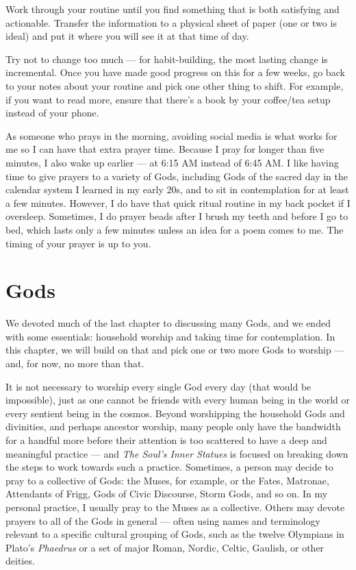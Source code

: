 \documentclass[
]{book}
\begin{document}
Work through your routine until you find something that is both satisfying and actionable. Transfer the information to a physical sheet of paper (one or two is ideal) and put it where you will see it at that time of day.

Try not to change too much --- for habit-building, the most lasting change is incremental. Once you have made good progress on this for a few weeks, go back to your notes about your routine and pick one other thing to shift. For example, if you want to read more, ensure that there's a book by your coffee/tea setup instead of your phone.

As someone who prays in the morning, avoiding social media is what works for me so I can have that extra prayer time. Because I pray for longer than five minutes, I also wake up earlier --- at 6:15 AM instead of 6:45 AM. I like having time to give prayers to a variety of Gods, including Gods of the sacred day in the calendar system I learned in my early 20s, and to sit in contemplation for at least a few minutes. However, I do have that quick ritual routine in my back pocket if I oversleep. Sometimes, I do prayer beads after I brush my teeth and before I go to bed, which lasts only a few minutes unless an idea for a poem comes to me. The timing of your prayer is up to you.

\hypertarget{gods}{%
\chapter{Gods}\label{gods}}

We devoted much of the last chapter to discussing many Gods, and we ended with some essentials: household worship and taking time for contemplation. In this chapter, we will build on that and pick one or two more Gods to worship --- and, for now, no more than that.

It is not necessary to worship every single God every day (that would be impossible), just as one cannot be friends with every human being in the world or every sentient being in the cosmos. Beyond worshipping the household Gods and divinities, and perhaps ancestor worship, many people only have the bandwidth for a handful more before their attention is too scattered to have a deep and meaningful practice --- and \emph{The Soul's Inner Statues} is focused on breaking down the steps to work towards such a practice. Sometimes, a person may decide to pray to a collective of Gods: the Muses, for example, or the Fates, Matronae, Attendants of Frigg, Gods of Civic Discourse, Storm Gods, and so on. In my personal practice, I usually pray to the Muses as a collective. Others may devote prayers to all of the Gods in general --- often using names and terminology relevant to a specific cultural grouping of Gods, such as the twelve Olympians in Plato's \emph{Phaedrus} or a set of major Roman, Nordic, Celtic, Gaulish, or other deities.
\end{document}
